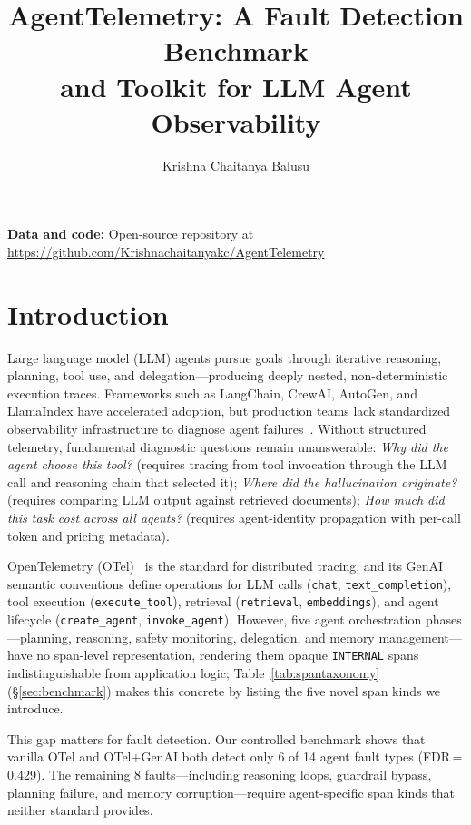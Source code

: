 \documentclass[sigconf,screen]{acmart}
\title[AgentTelemetry]{AgentTelemetry: A Fault Detection Benchmark\\and Toolkit for LLM Agent Observability}
\author{Krishna Chaitanya Balusu}
\affiliation{%
  \institution{Independent Researcher}
  \city{San Francisco}
  \country{USA}
}
\begin{document}
\maketitle
\sloppy

\noindent\textbf{Data and code:} Open-source repository at
\url{https://github.com/Krishnachaitanyakc/AgentTelemetry}

\section{Introduction}
\label{sec:introduction}

Large language model (LLM) agents pursue goals through iterative
reasoning, planning, tool use, and delegation---producing deeply nested,
non-deterministic execution traces.  Frameworks such as LangChain,
CrewAI, AutoGen, and LlamaIndex have accelerated adoption, but
production teams lack standardized observability infrastructure to
diagnose agent failures~\cite{agentops}.
Without structured telemetry, fundamental diagnostic questions remain
unanswerable:
\emph{Why did the agent choose this tool?} (requires tracing from tool
invocation through the LLM call and reasoning chain that selected it);
\emph{Where did the hallucination originate?} (requires comparing LLM
output against retrieved documents);
\emph{How much did this task cost across all agents?} (requires
agent-identity propagation with per-call token and pricing metadata).

OpenTelemetry (OTel)~\cite{otel} is the standard for distributed
tracing, and its GenAI semantic conventions define operations for LLM
calls (\texttt{chat}, \texttt{text\_completion}), tool execution
(\texttt{execute\_tool}), retrieval (\texttt{retrieval},
\texttt{embeddings}), and agent lifecycle (\texttt{create\_agent},
\texttt{invoke\_agent}).  However, five agent orchestration
phases---planning, reasoning, safety monitoring, delegation, and memory
management---have no span-level representation, rendering them opaque
\texttt{INTERNAL} spans indistinguishable from application logic;
Table~\ref{tab:spantaxonomy} (\S\ref{sec:benchmark}) makes this concrete
by listing the five novel span kinds we introduce.

This gap matters for fault detection.  Our controlled benchmark shows
that vanilla OTel and OTel+GenAI both detect only 6 of 14 agent fault
types (FDR\,=\,0.429).  The remaining 8 faults---including reasoning
loops, guardrail bypass, planning failure, and memory corruption---require
agent-specific span kinds that neither standard provides.
\end{document}
